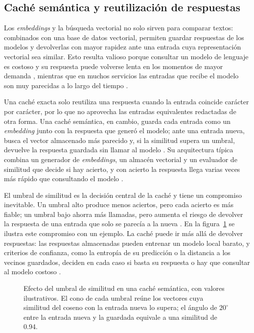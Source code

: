 \subsection{Caché semántica y reutilización de respuestas}\label{sec:mt_cache}

Los \textit{embeddings} y la búsqueda vectorial no solo sirven para comparar textos: combinados con una base de datos vectorial, permiten guardar respuestas de los modelos y devolverlas con mayor rapidez ante una entrada cuya representación vectorial sea similar. Esto resulta valioso porque consultar un modelo de lenguaje es costoso y su respuesta puede volverse lenta en los momentos de mayor demanda \cite{fu2023_gptcache}, mientras que en muchos servicios las entradas que recibe el modelo son muy parecidas a lo largo del tiempo \cite{stogiannidis2023_cache}.

Una caché exacta solo reutiliza una respuesta cuando la entrada coincide carácter por carácter, por lo que no aprovecha las entradas equivalentes redactadas de otra forma. Una caché semántica, en cambio, guarda cada entrada como un \textit{embedding} junto con la respuesta que generó el modelo; ante una entrada nueva, busca el vector almacenado más parecido y, si la similitud supera un umbral, devuelve la respuesta guardada sin llamar al modelo \cite{ak2025_siu}. Su arquitectura típica combina un generador de \textit{embeddings}, un almacén vectorial y un evaluador de similitud que decide si hay acierto, y con acierto la respuesta llega varias veces más rápido que consultando el modelo \cite{fu2023_gptcache}.

El umbral de similitud es la decisión central de la caché y tiene un compromiso inevitable. Un umbral alto produce menos aciertos, pero cada acierto es más fiable; un umbral bajo ahorra más llamadas, pero aumenta el riesgo de devolver la respuesta de una entrada que solo se parecía a la nueva \cite{ak2025_siu}. En la figura~\ref{fig:ant_cache} se ilustra este compromiso con un ejemplo. La caché puede ir más allá de devolver respuestas: las respuestas almacenadas pueden entrenar un modelo local barato, y criterios de confianza, como la entropía de su predicción o la distancia a los vecinos guardados, deciden en cada caso si basta su respuesta o hay que consultar al modelo costoso \cite{stogiannidis2023_cache}.

\begin{figure}[H]
\centering

\caption{Efecto del umbral de similitud en una caché semántica, con valores ilustrativos. El cono de cada umbral reúne los vectores cuya similitud del coseno con la entrada nueva lo supera; el ángulo de $20^\circ$ entre la entrada nueva y la guardada equivale a una similitud de 0.94.}
\label{fig:ant_cache}
\end{figure}

